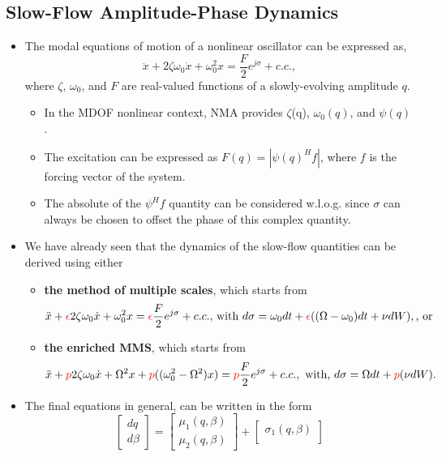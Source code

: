 \documentclass[11pt]{article}
\begin{document}
\subsection{Slow-Flow Amplitude-Phase Dynamics}
\label{sec:org1329c33}
\begin{itemize}
\item The modal equations of motion of a nonlinear oscillator can be expressed as,
$$ \ddot{x} + 2\zeta\omega_0 \dot{x} + \omega_0^2 x = \frac{F}{2} e^{j\sigma} + c.c., $$
where \(\zeta,\, \omega_0\), and \(F\) are real-valued functions of a slowly-evolving amplitude \(q\).
\begin{itemize}
\item In the MDOF nonlinear context, NMA provides \(\zeta\)(q), \(\omega_0(q)\), and \(\psi(q)\).
\item The excitation can be expressed as \(F(q) = |\psi(q)^H f|\), where \(f\) is the forcing vector of the system.
\item The absolute of the \(\psi^H f\) quantity can be considered w.l.o.g. since \(\sigma\) can always be chosen to offset the phase of this complex quantity.
\end{itemize}
\item We have already seen that the dynamics of the slow-flow quantities can be derived using either
\begin{itemize}
\item \textbf{the method of multiple scales}, which starts from
$$ \ddot{x} + \textcolor{red}{\epsilon} 2\zeta\omega_0 \dot{x} + \omega_0^2 x =
    \textcolor{red}{\epsilon} \frac{F}{2} e^{j\sigma}+c.c.,\,\text{with }
    d\sigma=\omega_0 dt+\textcolor{red}{\epsilon}((\Omega-\omega_0)dt+\nu dW ), \text{, or} $$
\item \textbf{the enriched MMS}, which starts from
$$ \ddot{x} + \textcolor{red}{p} 2\zeta\omega_0 \dot{x} + \Omega^2 x +
    \textcolor{red}{p} ((\omega_0^2-\Omega^2) x) = \textcolor{red}{p} \frac{F}{2}
    e^{j\sigma}+c.c.,\text{ with, } d\sigma = \Omega dt + \textcolor{red}{p}(\nu dW).$$
\end{itemize}
\item The final equations in general, can be written in the form
$$ \begin{bmatrix} dq\\ d\beta \end{bmatrix} = \begin{bmatrix} \mu_1(q,\beta)\\
    \mu_2(q,\beta) \end{bmatrix} + \begin{bmatrix} \sigma_1(q,\beta)\\

\end{bmatrix}$$
\end{itemize}
\end{document}
